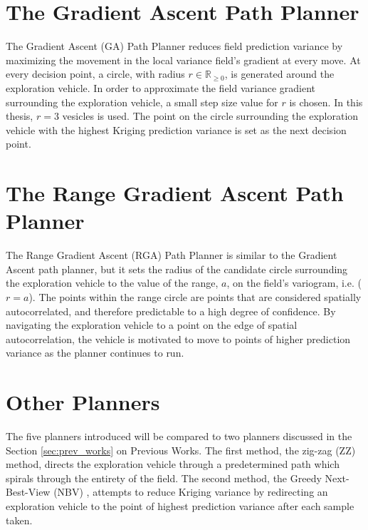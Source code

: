 

\section{The Gradient Ascent Path Planner}
The Gradient Ascent (GA) Path Planner reduces field prediction variance by maximizing the movement in the local variance field's gradient at every move. At every decision point, a circle, with radius $r \in \mathbb{R}_{\geq 0}$, is generated around the exploration vehicle. In order to approximate the field variance gradient surrounding the exploration vehicle, a small step size value for $r$ is chosen. In this thesis, $r=3$ vesicles is used. The point on the circle surrounding the exploration vehicle with the highest Kriging prediction variance is set as the next decision point.

\section{The Range Gradient Ascent Path Planner}
The Range Gradient Ascent (RGA) Path Planner is similar to the Gradient Ascent path planner, but it sets the radius of the candidate circle surrounding the exploration vehicle to the value of the range, $a$, on the field's variogram, i.e. ($r = a$). The points within the range circle are points that are considered spatially autocorrelated, and therefore predictable to a high degree of confidence. By navigating the exploration vehicle to a point on the edge of spatial autocorrelation, the vehicle is motivated to move to points of higher prediction variance as the planner continues to run.

\section{Other Planners}
The five planners introduced will be compared to two planners discussed in the Section \ref{sec:prev_works} on Previous Works. The first method, the zig-zag (ZZ) method, directs the exploration vehicle through a predetermined path which spirals through the entirety of the field. The second method, the Greedy Next-Best-View (NBV) \cite{fentanes:soilkrig}, attempts to reduce Kriging variance by redirecting an exploration vehicle to the point of highest prediction variance after each sample taken.

